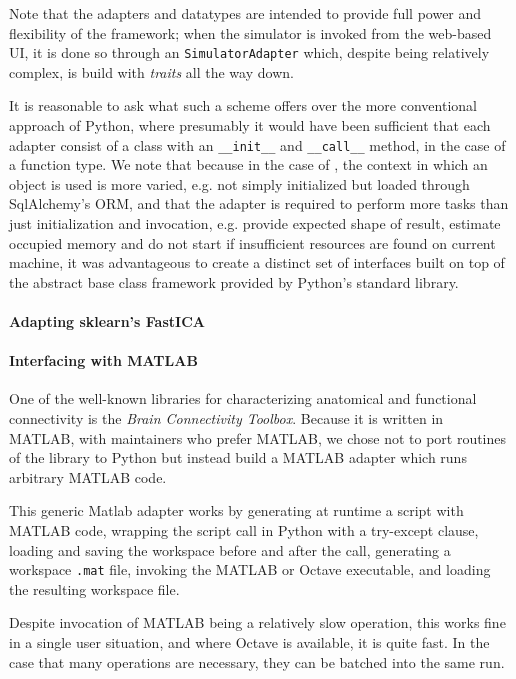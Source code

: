 Note that the adapters and datatypes are intended to provide full 
power and flexibility of the framework; when the simulator is invoked from
the web-based UI, it is done so through an \texttt{SimulatorAdapter} which,
despite being relatively complex, is build with \emph{traits} all the way down.

It is reasonable to ask what such a scheme offers over the more 
conventional approach of Python, where presumably it would have been
sufficient that each adapter consist of a class with an \texttt{\_\_init\_\_}
and \texttt{\_\_call\_\_} method, in the case of a function type. 
We note that because in the case of \TVB, the context in which an object
is used is more varied, e.g. not simply initialized but loaded through 
SqlAlchemy's ORM, and that the adapter is required to perform more tasks
than just initialization and invocation, e.g. provide expected shape of 
result, estimate occupied memory and do not start if insufficient resources are found on current machine,
 it was advantageous to create a distinct set of interfaces built on top of
the abstract base class framework provided by Python's standard library.

\paragraph{Adapting sklearn's FastICA}


\paragraph{Interfacing with MATLAB}

One of the well-known libraries for characterizing anatomical 
and functional connectivity is the \emph{Brain Connectivity Toolbox}. 
Because it is written in MATLAB, with maintainers who prefer MATLAB, we 
chose not to port routines of the library to Python but instead build
a MATLAB adapter which runs arbitrary MATLAB code. 

This generic Matlab adapter works by generating at runtime a script with MATLAB code, 
wrapping the script call in Python with a try-except clause,  
loading and saving the workspace before and after the call,
generating a workspace \texttt{.mat} file, invoking the MATLAB or Octave
executable, and loading the resulting workspace file. 

Despite invocation of MATLAB being a relatively slow operation, this works fine in a single
user situation, and where Octave is available, it is quite fast. In the 
case that many operations are necessary, they can be batched into the 
same run.



